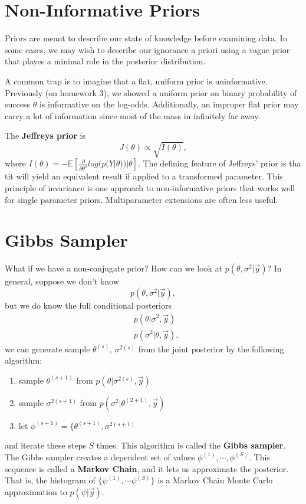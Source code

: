 \documentclass[titlepage, 12pt, leqno]{article}
\begin{document}
\pagebreak
\section{Non-Informative Priors}
Priors are meant to describe our state of knowledge before examining data. In
some cases, we may wish to describe our ignorance a priori using a vague prior
that playes a minimal role in the posterior distribution.

A common trap is to imagine that a flat, uniform prior is uninformative. 
Previously (on homework 3), we showed a uniform prior on binary probability of
success $\theta$ is informative on the log-odds. Additionally, an improper flat
prior may carry a lot of information since most of the mass in infinitely far
away.
\begin{definition}
    The \textbf{Jeffreys prior} is
    \[
    J(\theta) \propto \sqrt{I(\theta)},
    \]
    where $I(\theta) = - \mathbb{E}[\frac{\partial}{\partial \theta^{2}}
    log(p(Y|\theta)) | \theta]$. The defining feature of Jeffreys' prior is
    tha tit will yield an equivalent result if applied to a transformed 
    parameter. This principle of invariance is one approach to non-informative
    priors that works well for single parameter priors. Multiparameter 
    extensions are often less useful.
\end{definition}

\pagebreak
\section{Gibbs Sampler}
What if we have a non-conjugate prior? How can we look at $p(\theta,\sigma^{2}|
\vec y)$? In general, suppose we don't know
\[
p(\theta,\sigma^{2}|\vec y),
\]
but we do know the full conditional posteriors
\begin{align*}
    &p(\theta|\sigma^{2},\vec y)\\
    &p(\sigma^{2}|\theta, \vec y),
\end{align*}
we can generate sample $\theta^{(s)}$, $\sigma^{2(s)}$ from the joint
posterior by the following algorithm:
\begin{enumerate}
    \item sample $\theta^{(s+1)}$ from $p(\theta|\sigma^{2(s)},\vec y)$
    \item sample $\sigma^{2(s+1)}$ from $p(\sigma^{2}|\theta^{(2+1)}, \vec y)$
    \item let $\phi^{(s+1)} = \{\theta^{(s+1)}, \sigma^{2(s+1)}$
\end{enumerate}
and iterate these steps $S$ times. This algorithm is called the \textbf{Gibbs
sampler}. The Gibbs sampler creates a dependent set of values $\phi^{(1)},
\cdots , \phi^{(S)}$. This sequence is called a \textbf{Markov Chain}, and it
lets us approximate the posterior. That is, the histogram of $\{\psi^{(1)},
\cdots \psi^{(S)}\}$ is a Markov Chain Monte Carlo approximation to
$p(\psi|\vec y)$.
\end{document}

